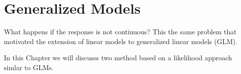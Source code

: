 \chapter{Generalized Models}
What happens if the response is not continuous? This the same
problem that motivated the extension of linear models to generalized
linear models (GLM).

In this Chapter we will discusss two method based on a likelihood
approach simlar to GLMs.



